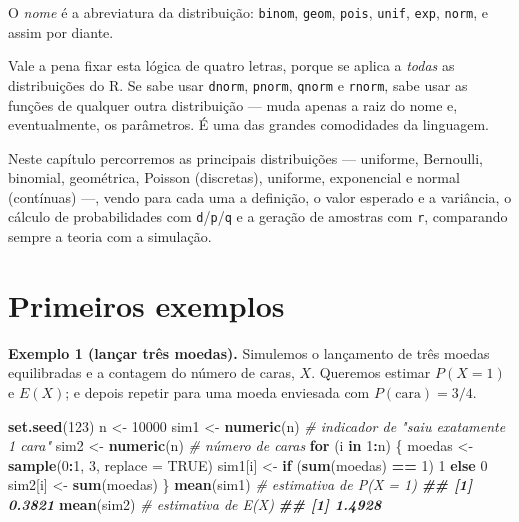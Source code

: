 \documentclass[
  portuguese,
  11pt,
  openany]{book}
\newenvironment{Shaded}{\begin{snugshade}}{\end{snugshade}}
\newcommand{\AttributeTok}[1]{\textcolor[rgb]{0.13,0.29,0.53}{#1}}
\newcommand{\CommentTok}[1]{\textcolor[rgb]{0.56,0.35,0.01}{\textit{#1}}}
\newcommand{\ConstantTok}[1]{\textcolor[rgb]{0.56,0.35,0.01}{#1}}
\newcommand{\ControlFlowTok}[1]{\textcolor[rgb]{0.13,0.29,0.53}{\textbf{#1}}}
\newcommand{\DecValTok}[1]{\textcolor[rgb]{0.00,0.00,0.81}{#1}}
\newcommand{\DocumentationTok}[1]{\textcolor[rgb]{0.56,0.35,0.01}{\textbf{\textit{#1}}}}
\newcommand{\FunctionTok}[1]{\textcolor[rgb]{0.13,0.29,0.53}{\textbf{#1}}}
\newcommand{\NormalTok}[1]{#1}
\newcommand{\OtherTok}[1]{\textcolor[rgb]{0.56,0.35,0.01}{#1}}
\newcommand{\SpecialCharTok}[1]{\textcolor[rgb]{0.81,0.36,0.00}{\textbf{#1}}}
\begin{document}
O \emph{nome} é a abreviatura da distribuição: \texttt{binom}, \texttt{geom}, \texttt{pois}, \texttt{unif}, \texttt{exp},
\texttt{norm}, e assim por diante.

Vale a pena fixar esta lógica de quatro letras, porque se aplica a \emph{todas} as
distribuições do R. Se sabe usar \texttt{dnorm}, \texttt{pnorm}, \texttt{qnorm} e \texttt{rnorm}, sabe usar as
funções de qualquer outra distribuição --- muda apenas a raiz do nome e, eventualmente,
os parâmetros. É uma das grandes comodidades da linguagem.

Neste capítulo percorremos as principais distribuições --- uniforme, Bernoulli, binomial,
geométrica, Poisson (discretas), uniforme, exponencial e normal (contínuas) ---, vendo
para cada uma a definição, o valor esperado e a variância, o cálculo de probabilidades
com \texttt{d}/\texttt{p}/\texttt{q} e a geração de amostras com \texttt{r}, comparando sempre a teoria com a
simulação.

\section{Primeiros exemplos}\label{primeiros-exemplos}

\textbf{Exemplo 1 (lançar três moedas).} Simulemos o lançamento de três moedas equilibradas
e a contagem do número de caras, \(X\). Queremos estimar \(P(X = 1)\) e \(E(X)\); e depois
repetir para uma moeda enviesada com \(P(\text{cara}) = 3/4\).

\begin{Shaded}
\begin{Highlighting}[]
\FunctionTok{set.seed}\NormalTok{(}\DecValTok{123}\NormalTok{)}
\NormalTok{n }\OtherTok{\textless{}{-}} \DecValTok{10000}
\NormalTok{sim1 }\OtherTok{\textless{}{-}} \FunctionTok{numeric}\NormalTok{(n)   }\CommentTok{\# indicador de "saiu exatamente 1 cara"}
\NormalTok{sim2 }\OtherTok{\textless{}{-}} \FunctionTok{numeric}\NormalTok{(n)   }\CommentTok{\# número de caras}
\ControlFlowTok{for}\NormalTok{ (i }\ControlFlowTok{in} \DecValTok{1}\SpecialCharTok{:}\NormalTok{n) \{}
\NormalTok{  moedas }\OtherTok{\textless{}{-}} \FunctionTok{sample}\NormalTok{(}\DecValTok{0}\SpecialCharTok{:}\DecValTok{1}\NormalTok{, }\DecValTok{3}\NormalTok{, }\AttributeTok{replace =} \ConstantTok{TRUE}\NormalTok{)}
\NormalTok{  sim1[i] }\OtherTok{\textless{}{-}} \ControlFlowTok{if}\NormalTok{ (}\FunctionTok{sum}\NormalTok{(moedas) }\SpecialCharTok{==} \DecValTok{1}\NormalTok{) }\DecValTok{1} \ControlFlowTok{else} \DecValTok{0}
\NormalTok{  sim2[i] }\OtherTok{\textless{}{-}} \FunctionTok{sum}\NormalTok{(moedas)}
\NormalTok{\}}
\FunctionTok{mean}\NormalTok{(sim1)   }\CommentTok{\# estimativa de P(X = 1)}
\DocumentationTok{\#\# [1] 0.3821}
\FunctionTok{mean}\NormalTok{(sim2)   }\CommentTok{\# estimativa de E(X)}
\DocumentationTok{\#\# [1] 1.4928}
\end{Highlighting}
\end{Shaded}
\end{document}

